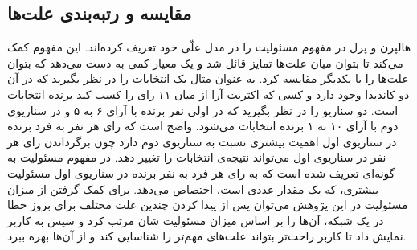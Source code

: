 \subsection{مقایسه و رتبه‌بندی علت‌ها}
هالپرن و پرل در 
\cite{hp2}
مفهوم مسئولیت
را در مدل علّی خود تعریف کرده‌اند.
این مفهوم کمک می‌کند تا بتوان میان علت‌ها تمایز قائل شد و یک معیار کمی به دست می‌دهد که بتوان علت‌ها را با یکدیگر مقایسه کرد.
به عنوان مثال یک انتخابات را در نظر بگیرید که در آن دو کاندیدا وجود دارد و کسی که اکثریت آرا از میان ۱۱ رای را کسب کند برنده انتخابات است. 
دو سناریو را در نظر بگیرید که در اولی نفر برنده با آرای ۶ به ۵ و در سناریوی دوم با آرای ۱۰ به ۱ برنده انتخابات می‌شود.
واضح است که رای هر نفر به فرد برنده در سناریوی اول اهمیت بیشتری نسبت به سناریوی دوم دارد چون برگرداندن رای هر نفر در سناریوی اول می‌تواند نتیجه‌ی انتخابات را تغییر دهد.
در
\cite{hp2}
مفهوم مسئولیت به گونه‌ای تعریف شده است که به رای هر فرد به نفر برنده در سناریوی‌ اول مسئولیت بیشتری، که یک مقدار عددی است، 
اختصاص می‌دهد.
برای کمک گرفتن از میزان مسئولیت در این پژوهش می‌توان پس از پیدا کردن چندین علت مختلف برای بروز خطا در یک شبکه، آن‌ها را بر اساس میزان مسئولیت شان مرتب کرد و سپس به کاربر نمایش داد تا کاربر راحت‌تر بتواند علت‌های مهم‌تر را شناسایی کند و از آن‌ها بهره ببرد.
